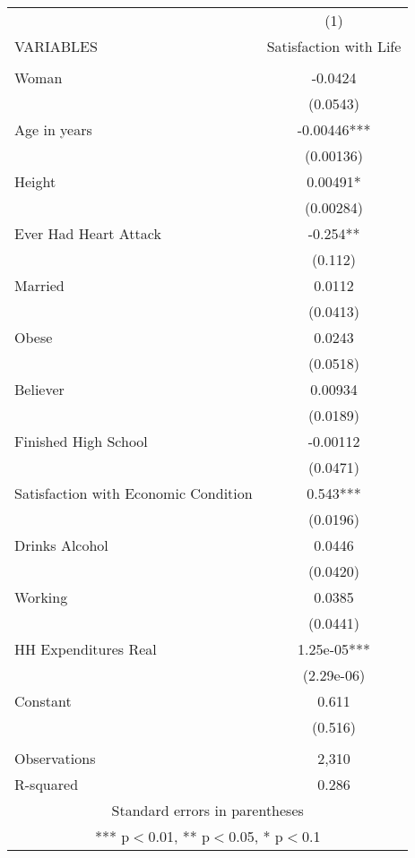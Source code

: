 \documentclass[]{article}
\begin{document}
\begin{tabular}{lc} \hline
 & (1) \\
VARIABLES & Satisfaction with Life \\ \hline
 &  \\
Woman & -0.0424 \\
 & (0.0543) \\
Age in years & -0.00446*** \\
 & (0.00136) \\
Height & 0.00491* \\
 & (0.00284) \\
Ever Had Heart Attack & -0.254** \\
 & (0.112) \\
Married & 0.0112 \\
 & (0.0413) \\
Obese & 0.0243 \\
 & (0.0518) \\
Believer & 0.00934 \\
 & (0.0189) \\
Finished High School & -0.00112 \\
 & (0.0471) \\
Satisfaction with Economic Condition & 0.543*** \\
 & (0.0196) \\
Drinks Alcohol & 0.0446 \\
 & (0.0420) \\
Working & 0.0385 \\
 & (0.0441) \\
HH Expenditures Real & 1.25e-05*** \\
 & (2.29e-06) \\
Constant & 0.611 \\
 & (0.516) \\
 &  \\
Observations & 2,310 \\
 R-squared & 0.286 \\ \hline
\multicolumn{2}{c}{ Standard errors in parentheses} \\
\multicolumn{2}{c}{ *** p$<$0.01, ** p$<$0.05, * p$<$0.1} \\
\end{tabular}
\end{document}
